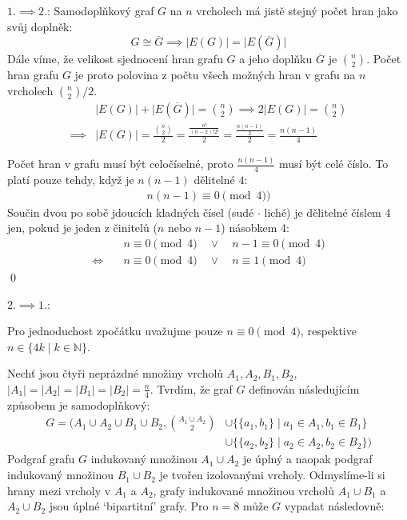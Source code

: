\documentclass{article}
\begin{document}
$1. \implies 2.$:
Samodoplňkový graf $G$ na $n$ vrcholech má jistě stejný počet hran jako svůj doplněk:
\[
    G \cong \overline{G}
    \implies \lvert E(G) \rvert = \lvert E(\overline{G}) \rvert
\]
Dále víme, že velikost sjednocení hran grafu $G$ a jeho doplňku $\overline{G}$ je $\binom{n}{2}$. Počet hran grafu $G$ je proto polovina z počtu všech možných hran v grafu na $n$ vrcholech $\binom{n}{2}/2$.
\begin{align*}
             & \lvert E(G) \rvert + \lvert E(\overline{G}) \rvert = \binom{n}{2}
    \implies 2 \lvert E(G) \rvert = \binom{n}{2}                                 \\
    \implies & \lvert E(G) \rvert = \frac{\binom{n}{2}}{2}
    = \frac{\frac{n!}{(n-2)! 2!}}{2}
    = \frac{\frac{n(n-1)}{2}}{2}
    = \frac{n(n-1)}{4}
\end{align*}

Počet hran v grafu musí být celočíselné, proto $\frac{n(n-1)}{4}$ musí být celé číslo. To platí pouze tehdy, když je $n(n-1)$ dělitelné $4$:
\begin{align*}
    n(n-1) \equiv 0 \pmod{4})
\end{align*}
Součin dvou po sobě jdoucích kladných čísel (sudé $\cdot$ liché) je dělitelné číslem 4 jen, pokud je jeden z činitelů ($n$ nebo $n-1$) násobkem 4:
\begin{align*}
     & n \equiv 0 \pmod{4} \quad \lor \quad n - 1 \equiv 0 \pmod{4} \\
    \Longleftrightarrow \quad
     & n \equiv 0 \pmod{4} \quad \lor \quad n \equiv 1 \pmod{4}
\end{align*}
\qed

$2. \implies 1.$:

Pro jednoduchost zpočátku uvažujme pouze $n \equiv 0 \pmod{4}$, respektive $n \in \{ 4k \mid k \in \mathbb{N} \}$.

Nechť jsou čtyři neprázdné množiny vrcholů $A_1, A_2, B_1, B_2$, $|A_1|=|A_2|=|B_1|=|B_2|=\frac{n}{4}$. Tvrdím, že graf $G$ definován následujícím způsobem je samodoplňkový:
\begin{align*}
    G = ( A_1 \cup A_2 \cup B_1 \cup B_2, \binom{A_1 \cup A_2}{2}
     & \cup \{ \{a_1, b_1\} \mid a_1 \in A_1, b_1 \in B_1 \} \\
     & \cup \{ \{a_2, b_2\} \mid a_2 \in A_2, b_2 \in B_2 \}
    )
\end{align*}
Podgraf grafu $G$ indukovaný množinou $A_1 \cup A_2$ je úplný a naopak podgraf indukovaný množinou $B_1 \cup B_2$ je tvořen izolovanými vrcholy. Odmyslíme-li si hrany mezi vrcholy v $A_1$ a $A_2$, grafy indukované množinou vrcholů $A_1 \cup B_1$ a $A_2 \cup B_2$ jsou úplné `bipartitní' grafy. Pro $n = 8$ může $G$ vypadat následovně:
\end{document}
